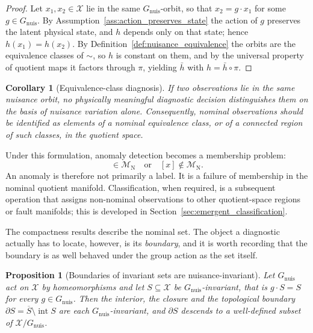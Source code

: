 \documentclass[a4paper]{cas-sc}
\newtheorem{proposition}{Proposition}
\newtheorem{corollary}{Corollary}
\newcommand{\X}{\ensuremath{\mathcal{X}}}
\newcommand{\Mnominal}{\ensuremath{\mathcal{M}_{\mathrm{N}}}}
\newcommand{\Gnuis}{\ensuremath{G_{\mathrm{nuis}}}}
\newcommand{\quotient}{\ensuremath{\mathcal{X}/G_{\mathrm{nuis}}}}
\begin{document}
\begin{proof}
Let \(x_1,x_2\in\X\) lie in the same \(\Gnuis\)-orbit, so that
\(x_2=g\cdot x_1\) for some \(g\in\Gnuis\). By
Assumption~\ref{ass:action_preserves_state} the action of \(g\) preserves the
latent physical state, and \(h\) depends only on that state; hence
\(h(x_1)=h(x_2)\). By Definition~\ref{def:nuisance_equivalence} the orbits are
the equivalence classes of \(\sim\), so \(h\) is constant on them, and by the
universal property of quotient maps it factors through \(\pi\), yielding
\(\bar h\) with \(h=\bar h\circ\pi\).
\end{proof}

\begin{corollary}[Equivalence-class diagnosis]
\label{cor:equivalence_class_diagnosis}
If two observations lie in the same nuisance orbit, no physically meaningful
diagnostic decision distinguishes them on the basis of nuisance variation
alone. Consequently, nominal observations should be identified as elements
of a nominal equivalence class, or of a connected region of such classes,
in the quotient space.
\end{corollary}

Under this formulation, anomaly detection becomes a membership problem:
\begin{equation}
[x] \in \Mnominal
\quad \text{or} \quad
[x] \notin \Mnominal .
\label{eq:membership}
\end{equation}
An anomaly is therefore not primarily a label. It is a failure of
membership in the nominal quotient manifold. Classification, when required,
is a subsequent operation that assigns non-nominal observations to other
quotient-space regions or fault manifolds; this is developed in
Section~\ref{sec:emergent_classification}.

The compactness results describe the nominal set. The object a diagnostic
actually has to locate, however, is its \emph{boundary}, and it is worth
recording that the boundary is as well behaved under the group action as the
set itself.

\begin{proposition}[Boundaries of invariant sets are nuisance-invariant]
\label{prop:boundary_invariant}
Let \(\Gnuis\) act on \(\X\) by homeomorphisms and let \(S\subseteq\X\) be
\(\Gnuis\)-invariant, that is \(g\cdot S=S\) for every \(g\in\Gnuis\). Then the
interior, the closure and the topological boundary
\(\partial S=\overline{S}\setminus\operatorname{int}S\) are each
\(\Gnuis\)-invariant, and \(\partial S\) descends to a well-defined subset of
\(\quotient\).
\end{proposition}
\end{document}
